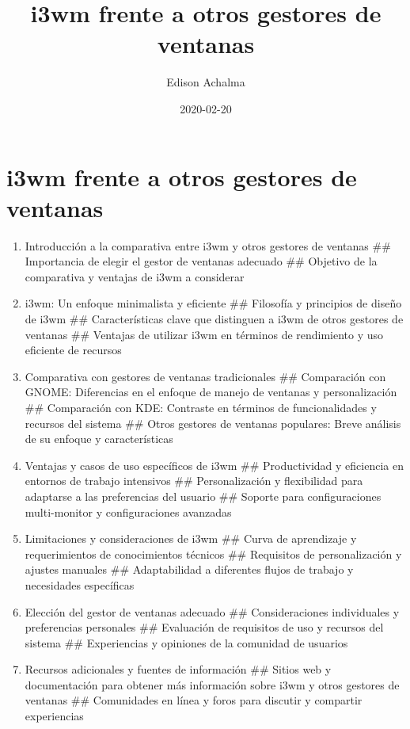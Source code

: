 \documentclass[
  jou,
  floatsintext,
  longtable,
  a4paper,
  nolmodern,
  notxfonts,
  notimes,
  12pt,
  colorlinks=true,linkcolor=blue,citecolor=blue,urlcolor=blue]{apa7}
\title{i3wm frente a otros gestores de ventanas}
\author{Edison Achalma}
\affiliation{
{Escuela Profesional de Economía, Universidad Nacional de San Cristóbal
de Huamanga}}
\date{2020-02-20}
\begin{document}
\maketitle


\hypertarget{toc}{}
\tableofcontents
\newpage
\section[Introduction]{i3wm frente a otros gestores de ventanas}

\setcounter{secnumdepth}{3}

\setlength\LTleft{0pt}




\begin{enumerate}
\def\labelenumi{\arabic{enumi}.}
\item
  Introducción a la comparativa entre i3wm y otros gestores de ventanas
  \#\# Importancia de elegir el gestor de ventanas adecuado \#\#
  Objetivo de la comparativa y ventajas de i3wm a considerar
\item
  i3wm: Un enfoque minimalista y eficiente \#\# Filosofía y principios
  de diseño de i3wm \#\# Características clave que distinguen a i3wm de
  otros gestores de ventanas \#\# Ventajas de utilizar i3wm en términos
  de rendimiento y uso eficiente de recursos
\item
  Comparativa con gestores de ventanas tradicionales \#\# Comparación
  con GNOME: Diferencias en el enfoque de manejo de ventanas y
  personalización \#\# Comparación con KDE: Contraste en términos de
  funcionalidades y recursos del sistema \#\# Otros gestores de ventanas
  populares: Breve análisis de su enfoque y características
\item
  Ventajas y casos de uso específicos de i3wm \#\# Productividad y
  eficiencia en entornos de trabajo intensivos \#\# Personalización y
  flexibilidad para adaptarse a las preferencias del usuario \#\#
  Soporte para configuraciones multi-monitor y configuraciones avanzadas
\item
  Limitaciones y consideraciones de i3wm \#\# Curva de aprendizaje y
  requerimientos de conocimientos técnicos \#\# Requisitos de
  personalización y ajustes manuales \#\# Adaptabilidad a diferentes
  flujos de trabajo y necesidades específicas
\item
  Elección del gestor de ventanas adecuado \#\# Consideraciones
  individuales y preferencias personales \#\# Evaluación de requisitos
  de uso y recursos del sistema \#\# Experiencias y opiniones de la
  comunidad de usuarios
\item
  Recursos adicionales y fuentes de información \#\# Sitios web y
  documentación para obtener más información sobre i3wm y otros gestores
  de ventanas \#\# Comunidades en línea y foros para discutir y
  compartir experiencias
\end{enumerate}
\end{document}
